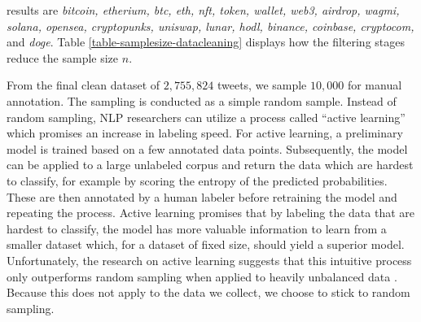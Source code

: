 results are \emph{bitcoin, etherium, btc, eth, nft, token, wallet, web3, airdrop, wagmi, solana, opensea, cryptopunks, uniswap, lunar, hodl, binance, coinbase, cryptocom,} and \emph{doge}. Table \ref{table-samplesize-datacleaning} displays how the filtering stages reduce the sample size $n$.



From the final clean dataset of $2,755,824$ tweets, we sample $10,000$ for manual annotation. The sampling is conducted as a simple random sample. Instead of random sampling, NLP researchers can utilize a process called ``active learning'' which promises an increase in labeling speed. For active learning, a preliminary model is trained based on a few annotated data points. Subsequently, the model can be applied to a large unlabeled corpus and return the data which are hardest to classify, for example by scoring the entropy of the predicted probabilities. These are then annotated by a human labeler before retraining the model and repeating the process. Active learning promises that by labeling the data that are hardest to classify, the model has more valuable information to learn from a smaller dataset which, for a dataset of fixed size, should yield a superior model. Unfortunately, the research on active learning suggests that this intuitive process only outperforms random sampling when applied to heavily unbalanced data . Because this does not apply to the data we collect, we choose to stick to random sampling.


